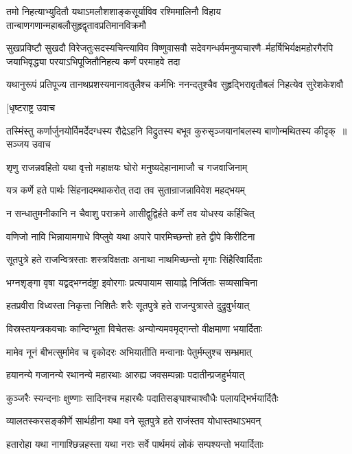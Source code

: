 \twolineshloka
{तमो निहत्याभ्युदितौ यथाऽमलौशशाङ्कसूर्याविव रश्मिमालिनौ}
{विहाय तान्बाणगणान्महाबलौसुहृद्वृतावप्रतिमानविक्रमौ}


\threelineshloka
{सुखप्रविष्टौ सुखदौ विरेजतुःसदस्यचिन्त्याविव विष्णुवासवौ}
{सदेवगन्धर्वमनुष्यचारणै--र्महर्षिभिर्यक्षमहोरगैरपि}
{जयाभिवृद्ध्या परयाऽभिपूजितौनिहत्य कर्णं परमाहवे तदा}


\twolineshloka
{यथानुरूपं प्रतिपूज्य तानथप्रशस्यमानावतुलैश्च कर्मभिः}
{ननन्दतुश्चैव सुहृद्भिरावृतौबलं निहत्येव सुरेशकेशवौ}


\twolineshloka
{[धृष्टराष्ट्र उवाच}
{}


\threelineshloka
{तस्मिंस्तु कर्णार्जुनयोर्विमर्देदग्धस्य रौद्रेऽहनि विद्रुतस्य}
{बभूव कुरुसृञ्जयानांबलस्य बाणोन्मथितस्य कीदृक् ॥सञ्जय उवाच}
{}


\twolineshloka
{शृणु राजन्नवहितो यथा वृत्तो महाक्षयः}
{घोरो मनुष्यदेहानामाजौ च गजवाजिनाम्}


\twolineshloka
{यत्र कर्णे हते पार्थः सिंहनादमथाकरोत्}
{तदा तव सुतान्राजन्नाविवेश महद्भयम्}


\twolineshloka
{न सन्धातुमनीकानि न चैवाशु पराक्रमे}
{आसीद्वुद्विर्हते कर्णे तव योधस्य कर्हिचित्}


\twolineshloka
{वणिजो नावि भिन्नायामगाधे विप्लुवे यथा}
{अपारे पारमिच्छन्तो हते द्वीपे किरीटिना}


\twolineshloka
{सूतपुत्रे हते राजन्वित्रस्ताः शस्त्रविक्षताः}
{अनाथा नाथमिच्छन्तो मृगाः सिंहैरिवार्दिताः}


\twolineshloka
{भग्नशृङ्गा वृषा यद्वद्भग्नदंष्ट्रा इवोरगाः}
{प्रत्यपायाम सायाह्ने निर्जिताः सव्यसाचिना}


\twolineshloka
{हतप्रवीरा विध्वस्ता निकृत्ता निशितैः शरैः}
{सूतपुत्रे हते राजन्पुत्रास्ते दुद्रुवुर्भयात्}


\twolineshloka
{विस्रस्तयन्त्रकवचाः कान्दिग्भूता विचेतसः}
{अन्योन्यमवमृद्गन्तो वीक्षमाणा भयार्दिताः}


\twolineshloka
{मामेव नूनं बीभत्सुर्मामेव च वृकोदरः}
{अभियातीति मन्वानाः पेतुर्मम्लुश्च सम्भ्रमात्}


\twolineshloka
{हयानन्ये गजानन्ये रथानन्ये महारथाः}
{आरुह्य जवसम्पन्नाः पदातीन्प्रजहुर्भयात्}


\twolineshloka
{कुञ्जरैः स्यन्दनाः क्षुण्णाः सादिनश्च महारथैः}
{पदातिसङ्घाश्चाश्वौधैः पलायद्भिर्भयार्दितैः}


\twolineshloka
{व्यालतस्करसङ्कीर्णे सार्थहीना यथा वने}
{सूतपुत्रे हते राजंस्तव योधास्तथाऽभवन्}


\twolineshloka
{हतारोहा यथा नागाश्छिन्नहस्ता यथा नराः}
{सर्वे पार्थमयं लोकं सम्पश्यन्तो भयार्दिताः}


